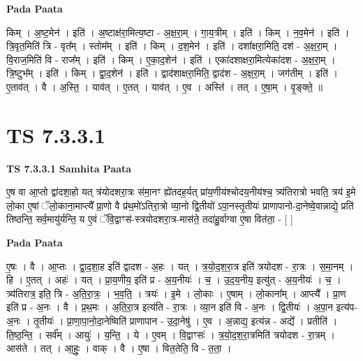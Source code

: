 \documentclass[17pt]{extarticle}
\begin{document}
\textbf{Pada Paata} \newline

किम् । अ॒ष्ट॒मेन॑ । इति॑ । अ॒ष्टाक्ष॑रा॒मित्य॒ष्टा - अ॒क्ष॒रा॒म् । गा॒य॒त्रीम् । इति॑ । किम् । न॒व॒मेन॑ । इति॑ । त्रि॒वृत॒मिति॑ त्रि - वृत᳚म् । स्तोम᳚म् । इति॑ । किम् । द॒श॒मेन॑ । इति॑ । दशा᳚क्षरा॒मिति॒ दश॑ - अ॒क्ष॒रा॒म् । वि॒राज॒मिति॑ वि - राज᳚म् । इति॑ । किम् । ए॒का॒द॒शेन॑ । इति॑ । एका॑दशाक्षरा॒मित्येका॑दश - अ॒क्ष॒रा॒म् । त्रि॒ष्टुभ᳚म् । इति॑ । किम् । द्वा॒द॒शेन॑ । इति॑ । द्वाद॑शाक्षरा॒मिति॒ द्वाद॑श - अ॒क्ष॒रा॒म् । जग॑तीम् । इति॑ । ए॒ताव॑त् । वै । अ॒स्ति॒ । याव॑त् । ए॒तत् । याव॑त् । ए॒व । अस्ति॑ । तत् । ए॒षा॒म् । वृ॒ङ्क्ते॒ ॥  \newline




\section*{ TS 7.3.3.1 }

\textbf{TS 7.3.3.1 } \newline
\textbf{Samhita Paata} \newline

ए॒ष वा आ॒प्तो द्वा॑दशा॒हो यत् त्र॑योदशरा॒त्रः स॑मा॒नꣳ ह्ये॑तदह॒र्यत् प्रा॑य॒णीय॑श्चोदय॒नीय॑श्च॒ त्र्य॑तिरात्रो भवति॒ त्रय॑ इ॒मे लो॒का ए॒षां ॅलो॒काना॒माप्त्यै᳚ प्रा॒णो वै प्र॑थ॒मो॑ऽतिरा॒त्रो व्या॒नो द्वि॒तीयो॑ ऽपा॒नस्तृ॒तीयः॑ प्राणापानो-दा॒नेष्वे॒वान्नाद्ये॒ प्रति॑ तिष्ठन्ति॒ सर्व॒मायु॑र्यन्ति॒ य ए॒वं ॅवि॒द्वाꣳस॑-स्त्रयोदशरा॒त्र-मास॑ते॒ तदा॑हु॒र्वाग्वा ए॒षा वित॑ता॒ - [  ] \newline

\textbf{Pada Paata} \newline

ए॒षः । वै । आ॒प्तः । द्वा॒द॒शा॒ह इति॑ द्वादश - अ॒हः । यत् । त्र॒यो॒द॒श॒रा॒त्र इति॑ त्रयोदश - रा॒त्रः । स॒मा॒नम् । हि । ए॒तत् । अहः॑ । यत् । प्रा॒य॒णीय॒ इति॑ प्र - अ॒य॒नीयः॑ । च॒ । उ॒द॒य॒नीय॒ इत्यु॑त् - अ॒य॒नीयः॑ । च॒ । त्र्य॑तिरात्र॒ इति॒ त्रि - अ॒ति॒रा॒त्रः॒ । भ॒व॒ति॒ । त्रयः॑ । इ॒मे । लो॒काः । ए॒षाम् । लो॒काना᳚म् । आप्त्यै᳚ । प्रा॒ण इति॑ प्र - अ॒नः । वै । प्र॒थ॒मः । अ॒ति॒रा॒त्र इत्य॑ति - रा॒त्रः । व्या॒न इति॑ वि - अ॒नः । द्वि॒तीयः॑ । अ॒पा॒न इत्य॑प-अ॒नः । तृ॒तीयः॑ । प्रा॒णा॒पा॒नो॒दा॒नेष्विति॑ प्राणापान - उ॒दा॒नेषु॑ । ए॒व । अ॒न्नाद्य॒ इत्य॑न्न - अद्ये᳚ । प्रतीति॑ । ति॒ष्ठ॒न्ति॒ । सर्व᳚म् । आयुः॑ । य॒न्ति॒ । ये । ए॒वम् । वि॒द्वाꣳसः॑ । त्र॒यो॒द॒श॒रा॒त्रमिति॑ त्रयोदश - रा॒त्रम् । आस॑ते । तत् । आ॒हुः॒ । वाक् । वै । ए॒षा । वित॒तेति॒ वि - त॒ता॒ ।  \newline
\end{document}
